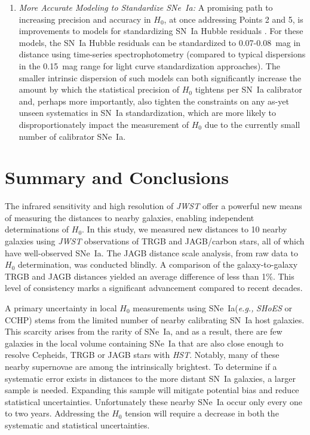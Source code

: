 \documentclass[12pt,modern]{aastex631}
\newcommand{\cchp}{\,CCHP\xspace}
\newcommand{\ho}{$H_{0}$\xspace}
\newcommand{\hst}{\emph{HST}\xspace}
\newcommand{\jwst}{\emph{JWST}\xspace}
\newcommand{\sne}{SNe~Ia\xspace}
\newcommand{\sn}{SN~Ia\xspace}
\newcommand{\shoes}{\emph{SHoES}\xspace}
\begin{document}
\begin{enumerate}
\item{\it More Accurate Modeling to Standardize \sne: } A promising  path to increasing precision and accuracy in \ho, at once addressing Points 2 and 5, is improvements to models for standardizing \sn Hubble residuals \citep[e.g.][]{boone_2021,stein_2022}. For these models, the \sn Hubble residuals can be  standardized to 0.07-0.08~mag in distance using  time-series spectrophotometry (compared to typical dispersions in the 0.15~mag range for light curve standardization approaches). The smaller intrinsic dispersion of such models can both significantly increase the amount by which the statistical precision of \ho tightens per \sn calibrator and, perhaps more importantly,  also tighten the constraints on any as-yet unseen systematics in \sn standardization, which are more likely to disproportionately impact the measurement  of \ho  due to the currently small number of calibrator \sne.


\end{enumerate}
        

\section{Summary and Conclusions}
\label{sec:conclusions}

The infrared sensitivity and high resolution of \jwst offer a powerful new means of measuring the distances to nearby galaxies,  enabling independent determinations of \ho. In this study, we measured new distances to 10 nearby galaxies using \jwst observations of  TRGB and JAGB/carbon stars, all of which have well-observed \sne. The JAGB distance scale analysis, from  raw data to \ho determination, was conducted blindly. A comparison of the galaxy-to-galaxy 
TRGB and JAGB distances yielded  an average difference of less than 1\%. This level of consistency marks a significant advancement compared to recent decades.



A primary uncertainty in local \ho measurements using \sne ({\it e.g.,} \shoes or \cchp) stems from the limited number of nearby calibrating  \sn host galaxies. This scarcity arises from the rarity of \sne, and as a result, there are few galaxies in the local volume containing \sne that are also close enough to resolve Cepheids, TRGB or JAGB stars with \hst. Notably, many of these nearby supernovae are among the intrinsically brightest. To determine if a systematic error exists in distances to the more distant \sn galaxies, a larger sample is needed. Expanding this sample will mitigate potential bias and reduce statistical uncertainties. Unfortunately  these nearby \sne occur only every one to two years. Addressing the \ho tension will require a decrease in both the systematic and statistical uncertainties. 
\end{document}
